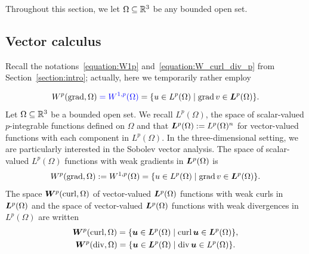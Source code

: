 \documentclass[10pt,a4paper]{article}
\newcommand\cye[1]{%
\protect\leavevmode
\begingroup
    \color{blue}%
    #1%
\endgroup
}
\begin{document}
Throughout this section, we let $\Omega \subseteq {\mathbb R}^{3}$ be any bounded open set.

\subsection{Vector calculus}

\cye{Recall the notations~\eqref{equation:W1p} and~\eqref{equation:W_curl_div_p} from Section~\ref{section:intro}; actually, here we temporarily rather employ }
\begin{gather*}
    W^{p}(\grad,\Omega) \cye{= W^{1,p}(\Omega)} = \{ u \in L^{p}(\Omega) \suchthat \grad v \in \bfL^{p}(\Omega) \}
    .
\end{gather*}
Let $\Omega \subseteq {\mathbb R}^{3}$ be a bounded open set. 
We recall $L^{p}(\Omega)$, the space of scalar-valued $p$-integrable functions defined on $\Omega$
and that $\bm{L}^{p}(\Omega) := L^{p}(\Omega)^{n}$ for vector-valued functions with each component in $L^{p}(\Omega)$. 
In the three-dimensional setting, we are particularly interested in the Sobolev vector analysis. 
The space of scalar-valued $L^{p}(\Omega)$ functions with weak gradients in $\bm{L}^{p}(\Omega)$ is 
\begin{gather*}
    W^{p}(\grad,\Omega) := W^{1,p}(\Omega) = \{ u \in L^{p}(\Omega) \suchthat \grad v \in \bfL^{p}(\Omega) \}
    .
\end{gather*}
The space $\bm{W}^{p}(\operatorname{curl},\Omega)$ of vector-valued $\bm{L}^{p}(\Omega)$ functions with weak curls in $\bm{L}^{p}(\Omega)$
and the space of vector-valued $\bm{L}^{p}(\Omega)$ functions with weak divergences in $L^{p}(\Omega)$ are written 
\begin{gather*}
    \bfW^{p}(\curl,\Omega) = \{ \bfu \in \bfL^{p}(\Omega) \suchthat \curl \bfu \in \bfL^{p}(\Omega) \},
    \\ 
    \bfW^{p}(\divergence,\Omega) = \{ \bfu \in \bfL^{p}(\Omega) \suchthat \divergence \bfu \in L^{p}(\Omega) \}.
\end{gather*}
\end{document}
